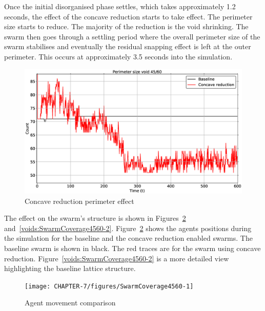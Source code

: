 Once the initial disorganised phase settles, which takes approximately 1.2 seconds, the effect of the concave reduction starts to take effect. The perimeter size starts to reduce. The majority of the reduction is the void shrinking. The swarm then goes through a settling period where the overall perimeter size of the swarm stabilises and eventually the residual snapping effect is left at the outer perimeter. This occurs at approximately 3.5 seconds into the simulation. 
\begin{figure}[H]
\begin{center}
\includegraphics[width=15cm]{CHAPTER-7/figures/ConcavePerimeter4560-1}
\end{center}
\caption{Concave reduction perimeter effect\label{methods:ConcavePerimeter4560-1}}
\end{figure}

The effect on the swarm's structure is shown in Figures~\ref{voids:SwarmCoverage4560-1} and~\ref{voids:SwarmCoverage4560-2}. Figure~\ref{voids:SwarmCoverage4560-1} shows the agents positions during the simulation for the baseline and the concave reduction enabled swarms. The baseline swarm is shown in black. The red traces are for the swarm using concave reduction. Figure~\ref{voids:SwarmCoverage4560-2} is a more detailed view highlighting the baseline lattice structure.
\begin{figure}[H]
\begin{center}
\texttt{[image: CHAPTER-7/figures/SwarmCoverage4560-1]}
\end{center}
\caption{Agent movement comparison\label{voids:SwarmCoverage4560-1}}
\end{figure}

